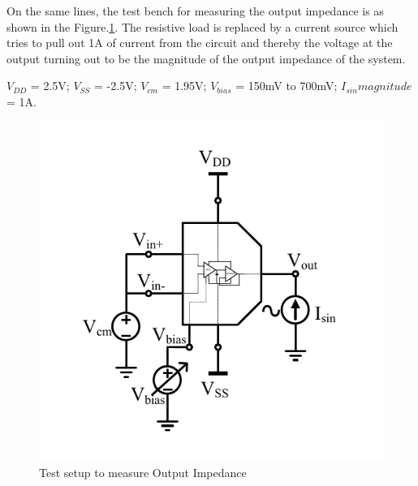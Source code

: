 On the same lines, the test bench for measuring the output impedance is as shown in the Figure.\ref{fig:TB_ZOUT}. The resistive load is replaced by a current source which tries to pull out 1A of current from the circuit and thereby the voltage at the output turning out to be the magnitude of the output impedance of the system.

$V_{DD}$ = 2.5V; $V_{SS}$ = -2.5V; $V_{cm}$ = 1.95V; $V_{bias}$ = 150mV to 700mV;  $I_{sin} magnitude$ = 1A.
\begin{figure} [H]
\centering
\includegraphics[scale=1]{Figures/Test_Benches/Overall/ZOUT.pdf}
\caption{Test setup to measure Output Impedance}
\label{fig:TB_ZOUT}
\end{figure}

